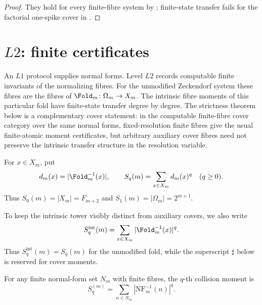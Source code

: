 \begin{proof}
They hold for every finite-fibre system by
; finite-state transfer fails for the
factorial one-spike cover in .
\end{proof}



\section{\texorpdfstring{\(L2\)}{L2}: finite certificates}\label{sec:L2}

An \(L1\) protocol supplies normal forms.  Level \(L2\) records computable
finite invariants of the normalizing fibres.  For the unmodified Zeckendorf
system these fibres are the fibres of \(\Fold_m\colon\Omega_m\to X_m\).  The
intrinsic fibre moments of this particular fold have finite-state transfer
degree by degree.  The strictness theorem below is a complementary cover
statement: in the computable finite-fibre cover category over the same normal
forms, fixed-resolution finite fibres give the usual finite-atomic moment
certificates, but arbitrary auxiliary cover fibres need not preserve the
intrinsic transfer structure in the resolution variable.

For \(x\in X_m\), put
\[
  d_m(x)=|\Fold_m^{-1}(x)|,
  \qquad
  S_q(m)=\sum_{x\in X_m} d_m(x)^q\quad(q\ge0).
\]
Thus \(S_0(m)=|X_m|=F_{m+2}\) and \(S_1(m)=|\Omega_m|=2^{m+1}\).

To keep the intrinsic tower visibly distinct from auxiliary covers, we also
write
\[
  S_q^{\mathrm{int}}(m)=\sum_{x\in X_m}|\Fold_m^{-1}(x)|^q .
\]
Thus \(S_q^{\mathrm{int}}(m)=S_q(m)\) for the unmodified fold, while the
superscript \(\sharp\) below is reserved for cover moments.

\begin{definition}\label{def:collision-moment}
For any finite normal-form set \(N_m\) with finite fibres, the \(q\)-th
collision moment is
\begin{equation}\label{eq:Sq}
  S_q^{(m)}=\sum_{n\in N_m}|\mathrm{NF}_m^{-1}(n)|^q .
\end{equation}
\end{definition}

